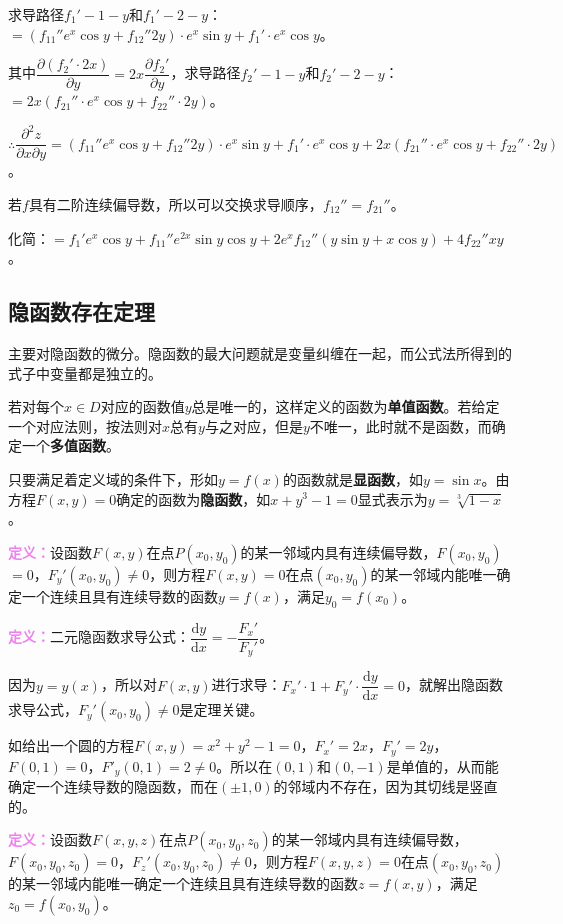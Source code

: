 \documentclass[UTF8, 12pt]{ctexart}
\begin{document}
求导路径$f_1'-1-y$和$f_1'-2-y$：$=(f_{11}''e^x\cos y+f_{12}''2y)\cdot e^x\sin y+f_1'\cdot e^x\cos y$。

其中$\dfrac{\partial(f_2'\cdot2x)}{\partial y}=2x\dfrac{\partial f_2'}{\partial y}$，求导路径$f_2'-1-y$和$f_2'-2-y$：$=2x(f_{21}''\cdot e^x\cos y+f_{22}''\cdot2y)$。

$\therefore\dfrac{\partial^2z}{\partial x\partial y}=(f_{11}''e^x\cos y+f_{12}''2y)\cdot e^x\sin y+f_1'\cdot e^x\cos y+2x(f_{21}''\cdot e^x\cos y+f_{22}''\cdot2y)$。

若$f$具有二阶连续偏导数，所以可以交换求导顺序，$f_{12}''=f_{21}''$。

化简：$=f_1'e^x\cos y+f_{11}''e^{2x}\sin y\cos y+2e^xf_{12}''(y\sin y+x\cos y)+4f_{22}''xy$。

\subsection{隐函数存在定理}

主要对隐函数的微分。隐函数的最大问题就是变量纠缠在一起，而公式法所得到的式子中变量都是独立的。

若对每个$x\in D$对应的函数值$y$总是唯一的，这样定义的函数为\textbf{单值函数}。若给定一个对应法则，按法则对$x$总有$y$与之对应，但是$y$不唯一，此时就不是函数，而确定一个\textbf{多值函数}。

只要满足着定义域的条件下，形如$y=f(x)$的函数就是\textbf{显函数}，如$y=\sin x$。由方程$F(x,y)=0$确定的函数为\textbf{隐函数}，如$x+y^3-1=0$显式表示为$y=\sqrt[3]{1-x}$。

\textcolor{violet}{\textbf{定义：}}设函数$F(x,y)$在点$P(x_0,y_0)$的某一邻域内具有连续偏导数，$F(x_0,y_0)$\\$=0$，$F_y'(x_0,y_0)\neq0$，则方程$F(x,y)=0$在点$(x_0,y_0)$的某一邻域内能唯一确定一个连续且具有连续导数的函数$y=f(x)$，满足$y_0=f(x_0)$。

\textcolor{violet}{\textbf{定义：}}二元隐函数求导公式：$\dfrac{\textrm{d}y}{\textrm{d}x}=-\dfrac{F_x'}{F_y'}$。

因为$y=y(x)$，所以对$F(x,y)$进行求导：$F_x'\cdot1+F_y'\cdot\dfrac{\textrm{d}y}{\textrm{d}x}=0$，就解出隐函数求导公式，$F_y'(x_0,y_0)\neq0$是定理关键。

如给出一个圆的方程$F(x,y)=x^2+y^2-1=0$，$F_x'=2x$，$F_y'=2y$，$F(0,1)=0$，$F'_y(0,1)=2\neq0$。所以在$(0,1)$和$(0,-1)$是单值的，从而能确定一个连续导数的隐函数，而在$(\pm1,0)$的邻域内不存在，因为其切线是竖直的。

\textcolor{violet}{\textbf{定义：}}设函数$F(x,y,z)$在点$P(x_0,y_0,z_0)$的某一邻域内具有连续偏导数，$F(x_0,y_0,z_0)=0$，$F_z'(x_0,y_0,z_0)\neq0$，则方程$F(x,y,z)=0$在点$(x_0,y_0,z_0)$的某一邻域内能唯一确定一个连续且具有连续导数的函数$z=f(x,y)$，满足$z_0=f(x_0,y_0)$。
\end{document}
